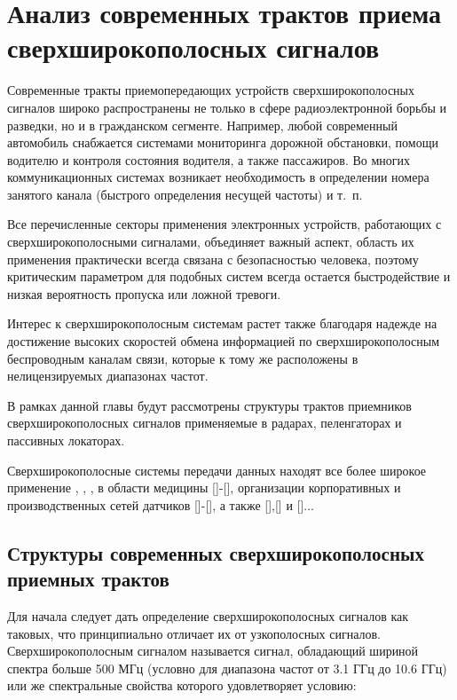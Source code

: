 \chapter{Анализ современных трактов приема сверхширокополосных сигналов}

Современные тракты приемопередающих устройств сверхширокополосных сигналов широко распространены не только в сфере радиоэлектронной борьбы и разведки, но и в гражданском сегменте. Например, любой современный автомобиль снабжается системами мониторинга дорожной обстановки, помощи водителю и контроля состояния водителя, а также пассажиров. Во многих коммуникационных системах возникает необходимость в определении номера занятого канала (быстрого определения несущей частоты) и т.~п.

Все перечисленные секторы применения электронных устройств, работающих с сверхширокополосными сигналами, объединяет важный аспект, область их применения практически всегда связана с безопасностью человека, поэтому критическим параметром для подобных систем всегда остается быстродействие и низкая вероятность пропуска или ложной тревоги.

Интерес к сверхширокополосным системам растет также благодаря надежде на достижение высоких скоростей обмена информацией по сверхширокополосным беспроводным каналам связи, которые к тому же расположены в нелицензируемых диапазонах частот.

В рамках данной главы будут рассмотрены структуры трактов приемников сверхширокополосных сигналов применяемые в радарах, пеленгаторах и пассивных локаторах.

Сверхширокополосные системы передачи данных находят все более широкое применение \cite{wosbib1}, \cite{vakbib1}, \cite{vakbib2}, \cite{scbib1} в области медицины []-[], организации корпоративных и производственных сетей датчиков []-[], а также [],[] и []...

\section{Структуры современных сверхширокополосных приемных трактов}

Для начала следует дать определение сверхширокополосных сигналов как таковых, что принципиально отличает их от узкополосных сигналов. Сверхширокополосным сигналом называется сигнал, обладающий шириной спектра больше 500 МГц (условно для диапазона частот от 3.1 ГГц до 10.6 ГГц) или же спектральные свойства которого удовлетворяет условию:

